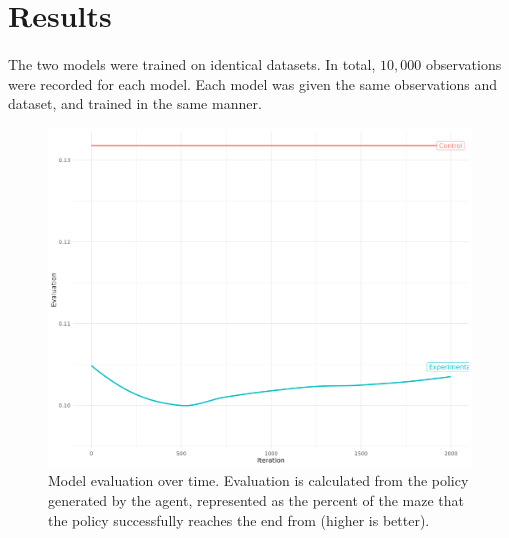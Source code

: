 \documentclass[12pt]{article}
\begin{document}




\newpage


\section{Results}

\paragraph{} 
The two models were trained on identical datasets.
In total, $10,000$ observations were recorded for each model. 
Each model was given the same observations and dataset, and trained in the same manner.

\begin{figure}[h]
    \includegraphics[width=\linewidth]{graph.png}
    \caption{Model evaluation over time. Evaluation is calculated from the policy generated by the agent, represented as the percent of the maze that the policy successfully reaches the end from (higher is better).}
\end{figure}
\end{document}
